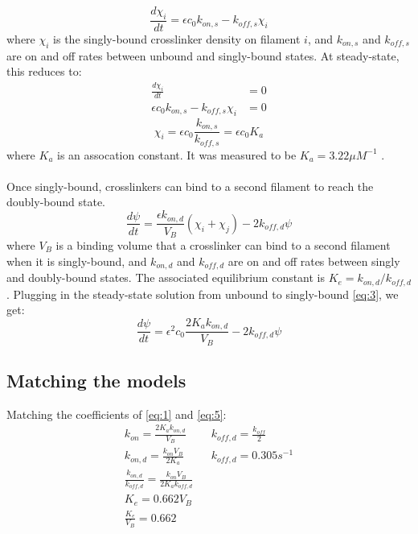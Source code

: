 \documentclass{article}[12pt]
\begin{document}
\begin{equation}
\frac{d\chi_i}{dt} = \epsilon c_0 k_{on,s} - k_{off,s} \chi_i \label{eq:2}
\end{equation}
where $\chi_i$ is the singly-bound crosslinker density on filament $i$, and $k_{on,s}$ and $k_{off,s}$ are on and off rates between unbound and singly-bound states. At steady-state, this reduces to:
\begin{align*}
	\frac{d\chi_i}{dt} &= 0\\
	\epsilon c_0 k_{on,s} - k_{off,s} \chi_i &= 0
\end{align*}
\begin{equation}
		\chi_i= \epsilon c_0 \frac{k_{on,s}}{k_{off,s}} = \epsilon c_0 K_a \label{eq:3}
\end{equation}
where $K_a$ is an assocation constant. It was measured to be $K_a = 3.22 \mu M^{-1}$ \cite{nakamura2007structural}.
\\
\\
Once singly-bound, crosslinkers can bind to a second filament to reach the doubly-bound state.
\begin{equation}
\frac{d\psi}{dt} = \frac{\epsilon k_{on,d}}{V_B}(\chi_i + \chi_j) - 2 k_{off,d} \psi \label{eq:4}
\end{equation}
where $V_B$ is a binding volume that a crosslinker can bind to a second filament when it is singly-bound, and $k_{on,d}$ and $k_{off,d}$ are on and off rates between singly and doubly-bound states. The associated equilibrium constant is $K_e = k_{on,d}/k_{off,d}$. Plugging in the steady-state solution from unbound to singly-bound \eqref{eq:3}, we get:
\begin{equation}
\frac{d\psi}{dt} = \epsilon^2 c_0 \frac{2  K_a k_{on,d}}{V_B} - 2 k_{off,d} \psi \label{eq:5}
\end{equation}

\subsection{Matching the models}
Matching the coefficients of \eqref{eq:1} and \eqref{eq:5}:
\begin{align*}
	k_{on} = \frac{2  K_a k_{on,d}}{V_B} && k_{off,d} = \frac{k_{off}}{2}\\
	k_{on,d} = \frac{k_{on} V_B}{2K_a} && k_{off,d} = 0.305 s^{-1}\\
	\frac{k_{on,d}}{k_{off,d}} = \frac{k_{on} V_B}{2K_a k_{off,d}}  &&\\
	K_e = 0.662 V_B &&\\
	\frac{K_e}{V_B} = 0.662 &&
\end{align*}
\end{document}
